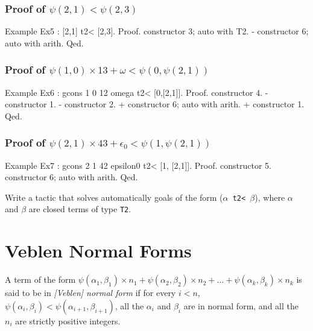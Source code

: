 {\subsubsection*{Proof of $\psi(2,1)<\psi(2,3)$}

\begin{Coqsrc}
Example Ex5 : [2,1] t2< [2,3].
Proof.
  constructor 3; auto with T2.
  - constructor 6; auto with arith.
Qed.
\end{Coqsrc}

\subsubsection*{Proof of $\psi(1,0)\times 13+ \omega < \psi(0,\psi(2,1))$}
\label{sect:ex6-first-proof}

\begin{Coqsrc}
Example Ex6 : gcons 1 0 12 omega t2< [0,[2,1]].
Proof.
  constructor 4.
  - constructor 1.
  - constructor 2.
    + constructor 6; auto with arith.
    + constructor 1.
Qed.
\end{Coqsrc}

\subsubsection*{Proof of $\psi(2,1)\times 43 + \epsilon_0 < \psi(1,\psi(2,1))$}

\begin{Coqsrc}
Example Ex7 : gcons 2 1 42 epsilon0 t2< [1, [2,1]].
Proof.
 constructor 5.
 constructor 6; auto with arith.
Qed.
\end{Coqsrc}

\begin{project}
Write a tactic that solves automatically goals of the form (\texttt{$\alpha$ t2< $\beta$}), where $\alpha$ and $\beta$ are closed terms of type \texttt{T2}.
\end{project}

\section{Veblen Normal Forms}
\begin{definition}
  A term of the form $\psi(\alpha_1,\beta_1)\times n_1+ \psi(\alpha_2,\beta_2)\times n_2+\dots+\psi(\alpha_k,\beta_k)\times n_k$ is said to be in
 \emph{[Veblen] normal form} if for every $i<n$, $\psi(\alpha_i,\beta_i)<\psi(\alpha_{i+1},\beta_{i+1})$, all the $\alpha_i$ and $\beta_i$ are in normal form, and all the $n_i$ are strictly positive integers.
\end{definition}

}
